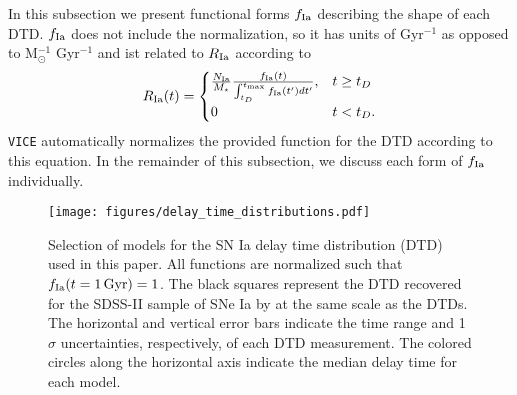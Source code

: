 \documentclass[twocolumn,twocolappendix,linenumbers,trackchanges]{aastex631}
\newcommand{\vice}{{\tt VICE}\xspace}
\begin{document}
In this subsection we present functional forms $f_{\rm Ia}$ describing the shape of each DTD. $f_{\rm Ia}$ does not include the normalization, so it has units of Gyr$^{-1}$ as opposed to M$_\odot^{-1}$ Gyr$^{-1}$ and ist related to $R_{\rm Ia}$ according to
\begin{equation}
    R_{\rm Ia}(t) = 
    \begin{cases}
        \frac{N_{\rm Ia}}{M_\star}
        \frac{f_{\rm Ia}(t)}{\int_{t_D}^{t_{\rm max}} f_{\rm Ia}(t') dt'}, & t \ge t_D \\
        0 & t < t_D.
    \end{cases}
    \label{eq:dtd-function}
\end{equation}
\vice automatically normalizes the provided function for the DTD according to this equation.
In the remainder of this subsection, we discuss each form of $f_{\rm Ia}$ individually.

\begin{figure}
    \centering
    \texttt{[image: figures/delay\_time\_distributions.pdf]}
    \caption{Selection of models for the SN Ia delay time distribution (DTD) used in this paper. All functions are normalized such that $f_{\rm Ia}(t=1\,{\rm Gyr})=1$. The black squares represent the DTD recovered for the SDSS-II sample of SNe Ia by \citet{Maoz2012-SloanIIDTD} at the same scale as the DTDs. The horizontal and vertical error bars indicate the time range and 1$\sigma$ uncertainties, respectively, of each DTD measurement. The colored circles along the horizontal axis indicate the median delay time for each model.}
    \label{fig:dtds}
\end{figure}
\end{document}
